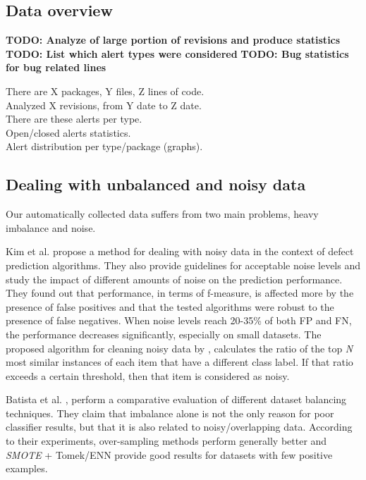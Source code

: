 \subsection{Data overview}

\textbf{TODO: Analyze of large portion of revisions and produce statistics}
\textbf{TODO: List which alert types were considered}
\textbf{TODO: Bug statistics for bug related lines}

There are X packages, Y files, Z lines of code.\\
Analyzed X revisions, from Y date to Z date.\\
There are these alerts per type.\\
Open/closed alerts statistics.\\
Alert distribution per type/package (graphs).\\


\subsection{Dealing with unbalanced and noisy data}

Our automatically collected data suffers from two main problems, heavy imbalance and noise. 

Kim et al. \cite{noise_defect} propose a method for dealing with noisy data in the context of defect prediction algorithms. They also provide guidelines for acceptable noise levels and study the impact of different amounts of noise on the prediction performance.
They found out that performance, in terms of f-measure, is affected more by the presence of false positives and that the tested algorithms were robust to the presence of false negatives. When noise levels reach 20-35\% of both FP and FN, the performance decreases significantly, especially on small datasets.
The proposed algorithm for cleaning noisy data by \cite{noise_defect}, calculates the ratio of the top \textit{N} most similar instances of each item that have a different class label. If that ratio exceeds a certain threshold, then that item is considered as noisy.

Batista et al. \cite{balancing_comparison}, perform a comparative evaluation of different dataset balancing techniques. They claim that imbalance alone is not the only reason for poor classifier results, but that it is also related to noisy/overlapping data. According to their experiments, over-sampling methods perform generally better and \textit{SMOTE} + Tomek/ENN provide good results for datasets with few positive examples.

